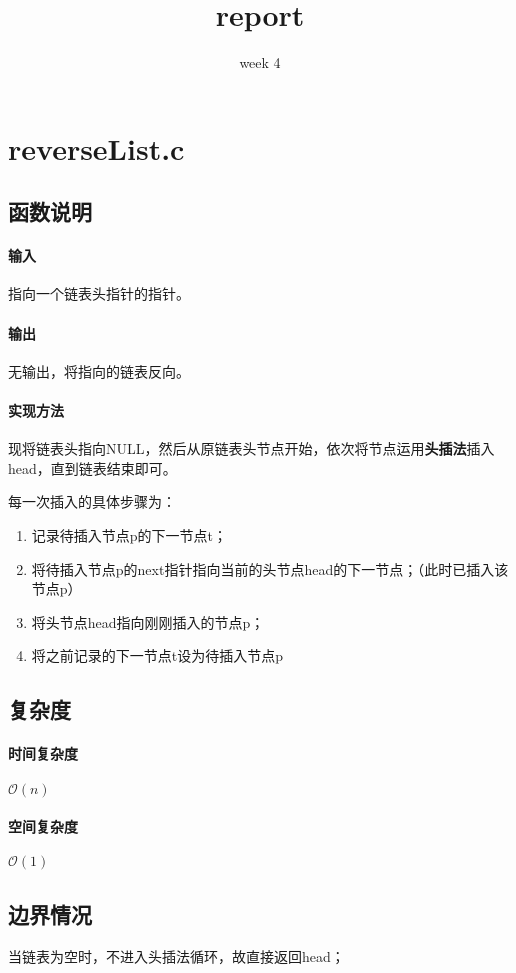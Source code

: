 \documentclass{homework}
\title{report}
\subtitle{week 4}
\begin{document}
\maketitle
\section{reverseList.c}
\subsection{函数说明}
\paragraph{输入}
指向一个链表头指针的指针。
\paragraph{输出}
无输出，将指向的链表反向。
\paragraph{实现方法}
现将链表头指向NULL，然后从原链表头节点开始，依次将节点运用{\bf 头插法}插入head，直到链表结束即可。

每一次插入的具体步骤为：
\begin{enumerate}
    \item 记录待插入节点p的下一节点t；
    \item 将待插入节点p的next指针指向当前的头节点head的下一节点；（此时已插入该节点p）
    \item 将头节点head指向刚刚插入的节点p；
    \item 将之前记录的下一节点t设为待插入节点p
\end{enumerate}
\subsection{复杂度}
\paragraph{时间复杂度}
$\mathcal{O}(n)$
\paragraph{空间复杂度}
$\mathcal{O}(1)$
\subsection{边界情况}
当链表为空时，不进入头插法循环，故直接返回head；
\end{document}
